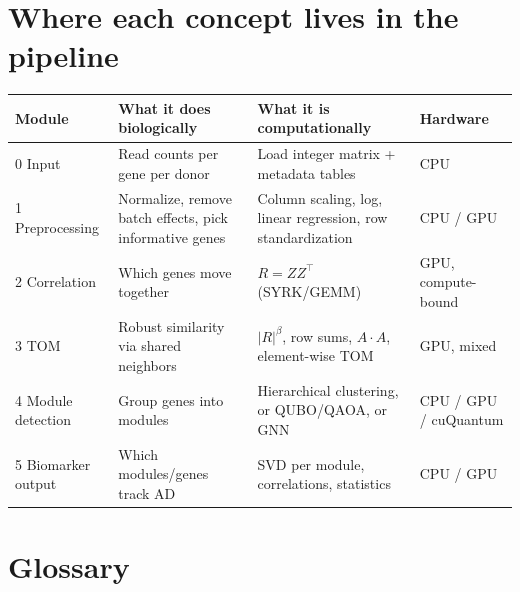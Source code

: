 \documentclass[11pt]{article}
\begin{document}
\section{Where each concept lives in the pipeline}
\label{sec:map}

\begin{center}
\small
\begin{tabularx}{\linewidth}{@{}lXXl@{}}
\toprule
Module & What it does biologically & What it is computationally & Hardware \\
\midrule
0 Input & Read counts per gene per donor & Load integer matrix + metadata tables & CPU \\
1 Preprocessing & Normalize, remove batch effects, pick informative genes & Column scaling, log, linear regression, row standardization & CPU / GPU \\
2 Correlation & Which genes move together & $R=ZZ^\top$ (SYRK/GEMM) & GPU, compute-bound \\
3 TOM & Robust similarity via shared neighbors & $|R|^\beta$, row sums, $A\cdot A$, element-wise TOM & GPU, mixed \\
4 Module detection & Group genes into modules & Hierarchical clustering, or QUBO/QAOA, or GNN & CPU / GPU / cuQuantum \\
5 Biomarker output & Which modules/genes track AD & SVD per module, correlations, statistics & CPU / GPU \\
\bottomrule
\end{tabularx}
\end{center}

\section{Glossary}
\label{sec:glossary}
\end{document}
